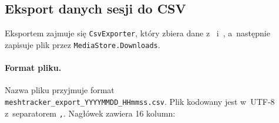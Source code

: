 \subsection*{Eksport danych sesji do CSV}
\label{sec:eksport-csv}

Eksportem zajmuje się \texttt{CsvExporter}, który zbiera dane z~\texttt{}
i~\texttt{}, a~następnie zapisuje plik przez \texttt{MediaStore.Downloads}.

\paragraph{Format pliku.}

Nazwa pliku przyjmuje format\\
\texttt{meshtracker\_export\_YYYYMMDD\_HHmmss.csv}.
Plik kodowany jest w~UTF-8 z~separatorem \texttt{,}. Nagłówek zawiera 16 kolumn:

